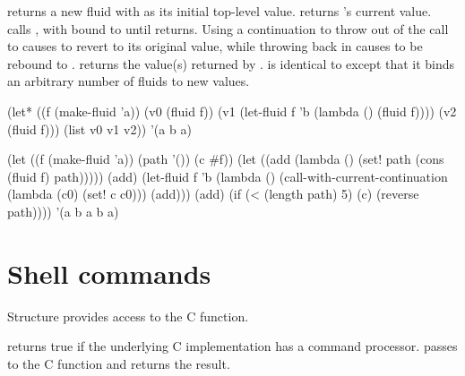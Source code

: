\begin{protos}
\end{protos}
\noindent
{} returns a new fluid with  as its initial
 top-level value.
 returns 's current value.
 calls , with  bound to 
 until  returns.
Using a continuation to throw out of the call to  causes
  to revert to its original value, while throwing back
 in causes  to be rebound to .
 returns the value(s) returned by .
 is identical to  except that it binds
 an arbitrary number of fluids to new values.

\begin{example}
(let* ((f (make-fluid 'a))
       (v0 (fluid f))
       (v1 (let-fluid f 'b
             (lambda ()
               (fluid f))))
       (v2 (fluid f)))
  (list v0 v1 v2))
  \evalsto '(a b a)
\end{example}

\begin{example}
(let ((f (make-fluid 'a))
      (path '())
      (c \#f))
  (let ((add (lambda ()
               (set! path (cons (fluid f) path)))))
    (add)
    (let-fluid f 'b
      (lambda ()
        (call-with-current-continuation
          (lambda (c0)
            (set! c c0)))
        (add)))
    (add)
    (if (< (length path) 5)
        (c)
        (reverse path))))
  \evalsto '(a b a b a)
\end{example}

\section{Shell commands}

Structure  provides access to the C 
 function.

\begin{protos}
\end{protos}
\noindent
{} returns true if the underlying C implementation
 has a command processor.
 passes  to the C
  function and returns the result.

